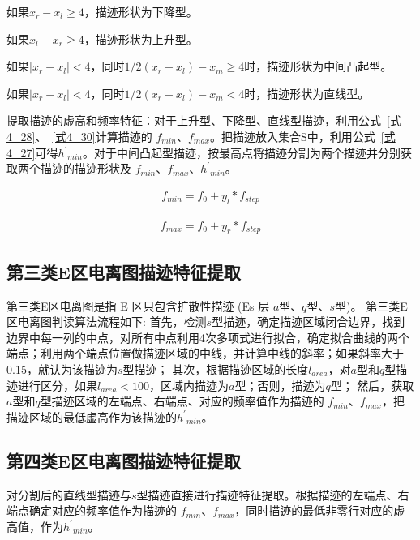 如果$x_{r}-x_{l} \geq 4$，描迹形状为下降型。

如果$x_{l}-x_{r}\geq 4$，描迹形状为上升型。

如果$|x_{r}-x_{l}|<4$，同时$1/2(x_{r}+x_{l} )-x_{m}\geq4$时，描迹形状为中间凸起型。

如果$|x_{r}-x_{l} |<4$，同时$1/2(x_{r}+x_{l} )-x_{m}<4$时，描迹形状为直线型。

提取描迹的虚高和频率特征：对于上升型、下降型、直线型描迹，利用公式~\ref{式4_28}、~\ref{式4_30}计算描迹的 $f_{min}$、$f_{max}$。把描迹放入集合S中，利用公式~\ref{式4_27}可得${h^{'}}_{min}$。对于中间凸起型描迹，按最高点将描迹分割为两个描迹并分别获取两个描迹的描迹形状及 $f_{min}$、$f_{max}$、${h^{'}}_{min}$。
\begin{linenomath}
\begin{align}
f_{min} = f_{0} + y_{l}*f_{step}
\label{式4_28}
\end{align}
\end{linenomath}
\begin{linenomath}
\begin{align}
f_{max} = f_{0} + y_{r}*f_{step}
\label{式4_30}
\end{align}
\end{linenomath}  
 
\subsection{第三类E区电离图描迹特征提取}

第三类E区电离图是指 E 区只包含扩散性描迹 (Es 层 $a$型、$q$型、$s$型)。 第三类E区电离图判读算法流程如下:
首先，检测$s$型描迹，确定描迹区域闭合边界，找到边界中每一列的中点，对所有中点利用4次多项式进行拟合，确定拟合曲线的两个端点；利用两个端点位置做描迹区域的中线，并计算中线的斜率；如果斜率大于 0.15，就认为该描迹为$s$型描迹；
其次，根据描迹区域的长度$l_{area}$，对$a$型和$q$型描迹进行区分，如果$l_{area} < 100$，区域内描迹为$a$型；否则，描迹为$q$型；
然后，获取$a$型和$q$型描迹区域的左端点、右端点、对应的频率值作为描迹的 $f_{min}$、$f_{max}$，把描迹区域的最低虚高作为该描迹的${h^{'}}_{min}$。

\subsection{第四类E区电离图描迹特征提取}

对分割后的直线型描迹与$s$型描迹直接进行描迹特征提取。根据描迹的左端点、右端点确定对应的频率值作为描迹的 $f_{min}$、$f_{max}$，同时描迹的最低非零行对应的虚高值，作为${h^{'}}_{min}$。

